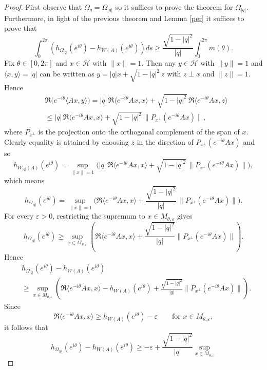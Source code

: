 \documentclass{article}
\begin{document}
\begin{proof}
First observe that $\Omega_q = \Omega_{|q|}$ so it suffices to prove the theorem for $\Omega_{|q|}$. Furthermore, in light of the previous theorem and Lemma \ref{per} it suffices to prove that 
$$
\int_0^{2 \pi} \left( h_{\Omega_{|q|}}(e^{ i \theta}) - h_{W(A)}(e^{ i \theta}) \right) ds   \geq \frac{\sqrt{1-|q|^2}}{|q|} \int_0^{2 \pi} m(\theta).
$$
Fix $\theta\in[0,2\pi]$ and $x \in \mathcal{H}$ with $\|x\|=1$. Then any $ y \in \mathcal{H}$ with $\|y\|=1$ and $\langle x,y\rangle=|q|$ can be written as
$y=|q|x+\sqrt{1-|q|^2}\,z$ with $z\perp x$ and $\|z\|=1$. Hence
\begin{align}
    &\Re\big(e^{-i\theta}\langle Ax,y\rangle\big)
= |q|\,\Re\langle e^{-i \theta}A x,x\rangle
+\sqrt{1-|q|^2}\,\Re\langle e^{-i \theta}A x,z\rangle \\
& \le |q|\,\Re\langle e^{-i \theta}A x,x\rangle + \sqrt{1-|q|^2}\,\|P_{x^\perp}(e^{-i \theta}A x)\|,
\end{align}
where $P_{x^\perp}$ is the projection onto the orthogonal complement of the span of $x$. Clearly equality is attained by choosing $z$ in the direction of $P_{x^\perp}(e^{-i \theta}A x)$ and so
\[
h_{W_{|q|}(A)}(e^{i\theta})
=\sup_{\|x\|=1}\Big(|q|\,\Re\langle e^{-i \theta}A x,x\rangle+\sqrt{1-|q|^2}\,\|P_{x^\perp}(e^{-i \theta}A x)\|\Big),
\]
which means
\begin{equation}\label{star1}
    h_{\Omega_{|q|}}(e^{i\theta})
=\sup_{\|x\|=1}\Big(\Re\langle e^{-i \theta}A x,x\rangle+\frac{\sqrt{1-|q|^2}}{|q|}\,\|P_{x^\perp}(e^{-i \theta}A x)\|\Big).
\end{equation}
For every $\varepsilon>0$, restricting the supremum to $x\in M_{\theta,\varepsilon}$ gives
\[
h_{\Omega_{|q|}}(e^{i\theta})
\ge
\sup_{x\in M_{\theta,\varepsilon}}
\left(
\Re\langle e^{-i\theta}Ax,x\rangle
+
\frac{\sqrt{1-|q|^2}}{|q|}
\|P_{x^\perp}(e^{-i\theta}Ax)\|
\right).
\]
Hence
\begin{align}
    &h_{\Omega_{|q|}}(e^{i\theta})-h_{W(A)}(e^{i\theta}) \\
&\ge
\sup_{x\in M_{\theta,\varepsilon}}
\left(
\Re\langle e^{-i\theta}Ax,x\rangle-h_{W(A)}(e^{i\theta})
+
\frac{\sqrt{1-|q|^2}}{|q|}
\|P_{x^\perp}(e^{-i\theta}Ax)\|
\right).
\end{align}
Since
\[
\Re\langle e^{-i\theta}Ax,x\rangle \ge h_{W(A)}(e^{i\theta})-\varepsilon
\qquad \text{for } x\in M_{\theta,\varepsilon},
\]
it follows that
\[
h_{\Omega_{|q|}}(e^{i\theta})-h_{W(A)}(e^{i\theta})
\ge
-\varepsilon+
\frac{\sqrt{1-|q|^2}}{|q|}
\sup_{x\in M_{\theta,\varepsilon}}
\]
\end{proof}
\end{document}
